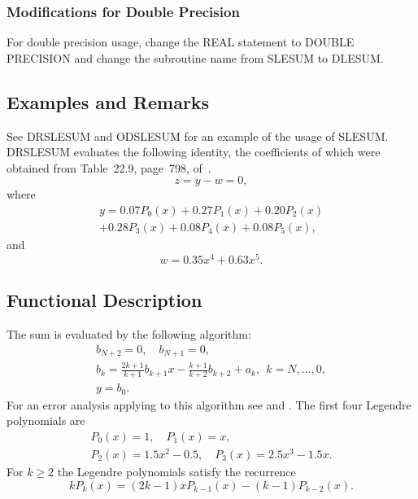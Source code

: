 \documentclass[twoside]{MATH77}
\begin{document}
\subsubsection{Modifications for Double Precision}

For double precision usage, change the REAL statement to DOUBLE PRECISION
and change the subroutine name from SLESUM to DLESUM.

\subsection{Examples and Remarks}

See DRSLESUM and ODSLESUM for an example of the usage of SLESUM. DRSLESUM
evaluates the following identity, the coefficients of which were obtained
from Table~22.9, page~798, of~\cite{ams55:or-poly}.
\begin{equation*}
z = y - w = 0,
\end{equation*}
where
\begin{multline*}
y = 0.07P_0(x) + 0.27P_1(x) + 0.20P_2(x)\\
+ 0.28P_3(x) + 0.08P_4(x) + 0.08P_5(x),
\end{multline*}
and
\begin{equation*}
w = 0.35x^4 + 0.63x^5.
\end{equation*}

\subsection{Functional Description}

The sum is evaluated by the following algorithm:
\begin{gather*}
b_{N+2}=0,\quad b_{N+1}=0,\\
b_k=\frac{2k+1}{k+1}b_{k+1}x-\frac{k+1}{k+2}b_{k+2}+a_k,\ \ k=N,...,0,\\
y=b_0.
\end{gather*}
For an error analysis applying to this algorithm see \cite{Ng:1968:DSS} and
\cite{Ng:1971:RAC}. The first four Legendre polynomials are \begin{gather*}
P_0(x) = 1,\quad P_1(x) = x,\\
P_2(x) = 1.5x^2 - 0.5,\quad P_3(x) = 2.5x^3 - 1.5x.
\end{gather*}
For $k \geq 2$ the Legendre polynomials satisfy the recurrence
\begin{equation*}
kP_k(x) = (2k-1)xP_{k-1}(x) - (k-1)P_{k-2}(x).
\end{equation*}
\end{document}
